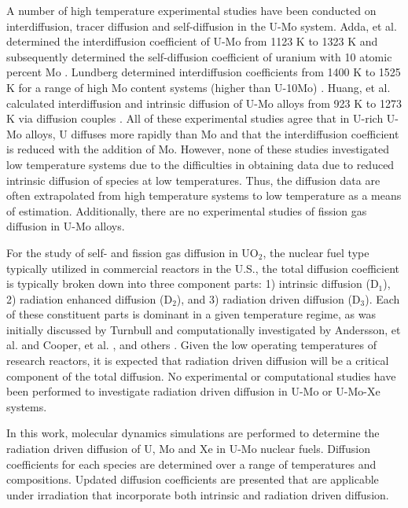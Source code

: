 \documentclass[review]{elsarticle}
\begin{document}
A number of high temperature experimental studies have been conducted on interdiffusion, tracer diffusion and self-diffusion in the U-Mo system. Adda, et al. determined the interdiffusion coefficient of U-Mo from 1123 K to 1323 K and subsequently determined the self-diffusion coefficient of uranium with 10 atomic percent Mo \cite{adda1962}. Lundberg determined interdiffusion coefficients from 1400 K to 1525 K for a range of high Mo content systems (higher than U-10Mo) \cite{lundberg1989}. Huang, et al. calculated interdiffusion and intrinsic diffusion of U-Mo alloys from 923 K to 1273 K via diffusion couples \cite{huang2013}. All of these experimental studies agree that in U-rich U-Mo alloys, U diffuses more rapidly than Mo and that the interdiffusion coefficient is reduced with the addition of Mo. However, none of these studies investigated low temperature systems due to the difficulties in obtaining data due to reduced intrinsic diffusion of species at low temperatures. Thus, the diffusion data are often extrapolated from high temperature systems to low temperature as a means of estimation. Additionally, there are no experimental studies of fission gas diffusion in U-Mo alloys. 

For the study of self- and fission gas diffusion in UO$_2$, the nuclear fuel type typically utilized in commercial reactors in the U.S., the total diffusion coefficient is typically broken down into three component parts: 1) intrinsic diffusion (D$_1$), 2) radiation enhanced diffusion (D$_2$), and 3) radiation driven diffusion (D$_3$). Each of these constituent parts is dominant in a given temperature regime, as was initially discussed by Turnbull \cite{turnbull1982} and computationally investigated by Andersson, et al. \cite{andersson2014} and Cooper, et al. \cite{cooper2016}, and others \cite{matthews_cluster_2019, perriot_atomistic_2019, wormald2015, martin2009}. Given the low operating temperatures of research reactors, it is expected that radiation driven diffusion will be a critical component of the total diffusion. No experimental or computational studies have been performed to investigate radiation driven diffusion in U-Mo or U-Mo-Xe systems.

In this work, molecular dynamics simulations are performed to determine the radiation driven diffusion of U, Mo and Xe in U-Mo nuclear fuels. Diffusion coefficients for each species are determined over a range of temperatures and compositions. Updated diffusion coefficients are presented that are applicable under irradiation that incorporate both intrinsic and radiation driven diffusion. 
\end{document}
